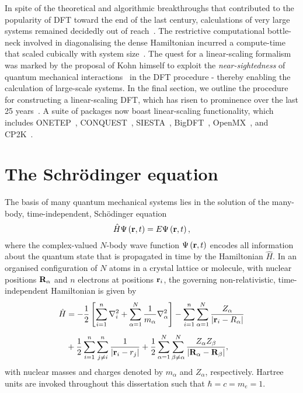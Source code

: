 {
In spite of the theoretical and algorithmic breakthroughs 
that contributed to the popularity of DFT 
{toward the end of} the last century, 
calculations of very large systems 
remained decidedly out of reach~\cite{guerra1998towards}.
%
The restrictive computational bottle-neck 
involved in diagonalising the dense Hamiltonian 
{incurred} a compute-time 
that scaled cubically with system size~\cite{PhysRevLett.66.1438}.
% 
The quest for a linear-scaling formalism 
was marked by the proposal of Kohn himself 
to exploit the {\it near-sightedness} of quantum mechanical 
interactions~\cite{PhysRevLett.76.3168} 
in the DFT procedure - 
thereby enabling the calculation 
of large-scale systems.
%
In the final section, 
we outline the procedure for 
{constructing a} linear-scaling DFT, 
which has risen to prominence over the last 25 years~\cite{0953-8984-22-7-074207,RevModPhys.71.1085}.
%
{A suite of packages now boast linear-scaling functionality},
which includes  
{\sc ONETEP}~\cite{skylaris2005introducing,hine2009linear,hine2010linear}, 
{\sc CONQUEST}~\cite{Gillan200714,0953-8984-14-11-303},
{\sc SIESTA}~\cite{0953-8984-14-11-302,0953-8984-20-6-064208}, 
{\sc BigDFT}~\cite{Genovese2011149}, 
{\sc OpenMX}~\cite{PhysRevB.67.155108,PhysRevB.72.045121}, 
and {\sc CP2K}~\cite{doi:10.1063/1.2841077}.}
%



\section{The Schr{\" o}dinger equation}
\label{sec:schrodinger_equation}

The basis of many quantum mechanical {systems}   
lies in the solution of the many-body, time-independent, 
Sch{\"o}dinger equation~\cite{PhysRev.28.1049}
%
\begin{equation}
\hat H \Psi \left({\bf r},t\right)
=E\Psi \left({\bf r},t\right),
\end{equation}
%
where the complex-valued $N$-body wave function 
$\Psi \left({\bf r},t\right)$ 
encodes all information about the quantum state 
that is {propagated in time} by the Hamiltonian $\hat H$. 
%
In an organised configuration of $N$  atoms 
in a crystal lattice or molecule, 
with nuclear positions $\bf R_\alpha$ 
and $n$ electrons at positions ${{\bf r}}_i$, 
the governing non-relativistic, 
time-independent Hamiltonian  
is given by 
%
\begin{align}
\hat H &= -\frac{1}{2}\left[\sum_{i=1}^n\nabla^2_i+\sum_{\alpha=1}^N\frac{1}{m_\alpha}\nabla^2_\alpha\right] 
- \sum_{i=1}^n\sum_{\alpha=1}^N\frac{Z_\alpha}{|{{\bf r}}_i-R_\alpha|}\nonumber\\[0.5em]
&+\frac{1}{2}\sum_{i=1}^n\sum_{j\neq i}^n\frac{1}{|{{\bf r}}_i-r_j|} 
+ \frac{1}{2}\sum_{\alpha=1}^N\sum_{\beta\neq\alpha}^N\frac{Z_\alpha Z_\beta}{|\bf R_\alpha-R_\beta|},
\label{eq:full_hamiltonian}
\end{align}
%
with nuclear masses and charges 
denoted by $m_\alpha$ and $Z_\alpha$, {respectively}.
%
Hartree units are invoked throughout this dissertation 
such that $\hbar=c=m_e=1$.

